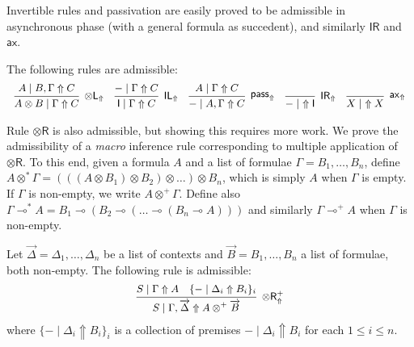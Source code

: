 \documentclass[runningheads]{llncs}
\renewcommand{\vec}{\overrightarrow}
\newcommand{\tl}{\otimes \mathsf{L}}
\newcommand{\tr}{\otimes \mathsf{R}}
\newcommand{\pass}{\mathsf{pass}}
\newcommand{\unitl}{\mathsf{IL}}
\newcommand{\unitr}{\mathsf{IR}}
\newcommand{\otL}{\tl}
\newcommand{\otR}{\tr}
\newcommand{\IL}{\unitl}
\newcommand{\IR}{\unitr}
\newcommand{\ax}{\mathsf{ax}}
\newcommand{\ot}{\otimes}
\newcommand{\lolli}{\multimap}
\newcommand{\I}{\mathsf{I}}
\newcommand{\up}{\Uparrow}
\begin{document}
Invertible rules and passivation are easily proved to be admissible in asynchronous phase (with a general formula as succedent), and similarly $\IR$ and  $\ax$.
\begin{proposition}
  The following rules are admissible:
  \[
  \small
  \begin{array}{c}
    \infer[\otL_\up]{A \ot B \mid \Gamma \up C}{A \mid  B , \Gamma \up C}
    \quad
    \infer[\IL_\up]{\I \mid \Gamma \up C}{- \mid \Gamma \up C}
    \quad
    \infer[\pass_\up]{- \mid A , \Gamma \up C}{
      A\mid \Gamma \up C
    }
    \quad
    \infer[\IR_\up]{- \mid ~ \up \I}{}
    \quad
    \infer[\ax_\up]{X \mid ~ \up X}{}    
  \end{array}
\]  
\end{proposition}
Rule $\otR$ is also admissible, but showing this requires more work. We prove the admissibility of a \emph{macro} inference rule corresponding to multiple application of $\otR$. To this end, given a formula $A$ and a list of formulae $\Gamma = B_1,\dots,B_n$, define $A \ot^* \Gamma = (((A \ot B_1) \ot B_2) \ot \dots) \ot B_n$, which is simply $A$ when $\Gamma$ is empty. If $\Gamma$ is non-empty, we write $A \ot^+ \Gamma$. Define also $\Gamma \lolli^* A = B_1 \lolli (B_2 \lolli (\dots \lolli (B_n \lolli A)))$ and similarly $\Gamma\lolli^+ A$ when $\Gamma$ is non-empty.
\begin{proposition}\label{prop:otR}
  Let $\vec{\Delta} = \Delta_1,\dots,\Delta_n$ be a list of contexts and $\vec{B} = B_1,\dots,B_n$ a list of formulae, both non-empty.
  The following rule is admissible:
  \[
  \small
  \begin{array}{c}
    \infer[\otR^+_\up]{S \mid \Gamma , \vec{\Delta} \up A \ot^+ \vec{B}}{
      S \mid \Gamma \up A
      &
      \{ - \mid \Delta_i \up B_i \}_{i}
    }
  \end{array}
  \]
  where $\{ - \mid \Delta_i \up B_i \}_{i}$ is a collection of premises $- \mid \Delta_i \up B_i$ for each $1 \le i \le n$.
\end{proposition}
\end{document}

